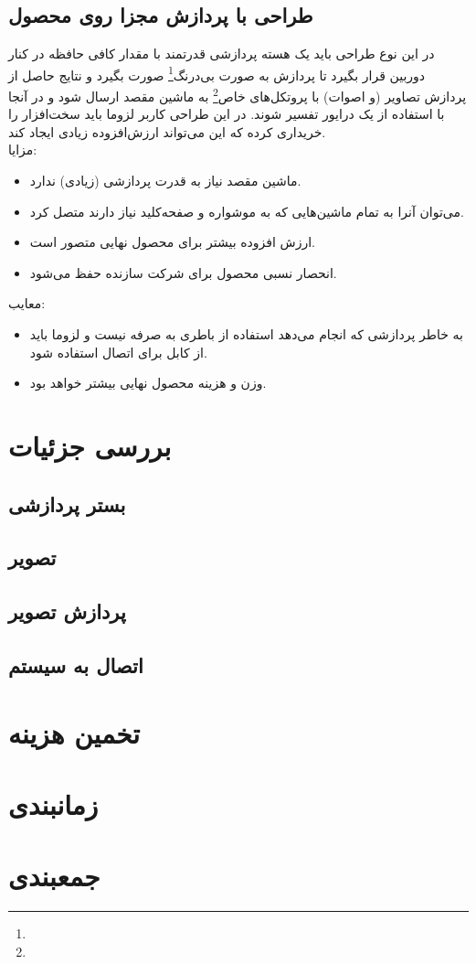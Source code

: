 \documentclass{article}
\begin{document}
\subsection{طراحی با پردازش مجزا روی محصول}
در این نوع طراحی باید یک هسته پردازشی قدرتمند با مقدار کافی حافظه در کنار 
دوربین قرار بگیرد تا پردازش به صورت بی‌درنگ\footnote{} صورت بگیرد و نتایج حاصل از پردازش تصاویر (و اصوات) با پروتکل‌های خاص\footnote{} به ماشین مقصد ارسال شود و در آنجا با استفاده از یک درایور تفسیر شوند. در این طراحی کاربر لزوما باید سخت‌افزار را خریداری کرده که این می‌تواند ارزش‌افزوده زیادی ایجاد کند. \\
	مزایا:
	\begin{itemize}
		\item ماشین مقصد نیاز به قدرت پردازشی (زیادی) ندارد.
		\item می‌توان آنرا به تمام ماشین‌هایی که به موشواره و صفحه‌کلید نیاز دارند متصل کرد.
		\item ارزش‌ افزوده بیشتر برای محصول نهایی متصور است.
		\item انحصار نسبی محصول برای شرکت سازنده حفظ می‌شود.
	\end{itemize}
	معایب:
	\begin{itemize}
		\item به خاطر پردازشی که انجام می‌دهد استفاده از باطری‌ به صرفه نیست و لزوما باید از کابل برای اتصال استفاده شود.
		\item وزن و هزینه محصول نهایی بیشتر خواهد بود.
	\end{itemize}

\section{بررسی جزئیات}
\subsection{بستر پردازشی}

\subsection{تصویر}

\subsection{پردازش تصویر}

\subsection{اتصال به سیستم}

\subsection{}

\section{تخمین هزینه}

\section{زمانبندی}

\section{جمعبندی}
\end{document}
